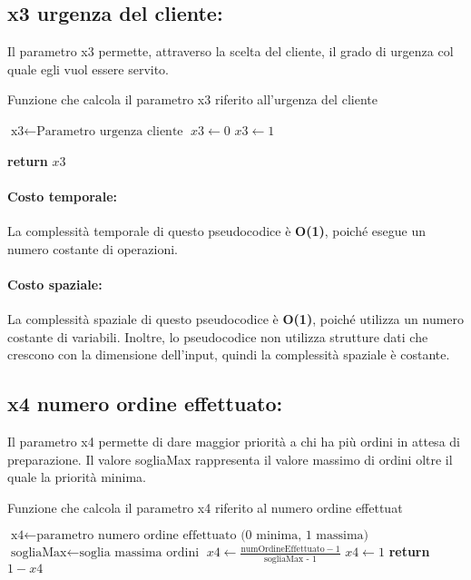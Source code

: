 \subsection{x3 urgenza del cliente:}
Il  parametro x3 permette, attraverso la scelta del cliente, il grado di urgenza col quale egli vuol essere servito.
\begin{algorithm}[h]
	\begin{algorithmic}[h!]
		\caption{Funzione che calcola il parametro x3 riferito all'urgenza del cliente}
		\medskip
		\State $\text{x3} \gets \text{Parametro urgenza cliente}$
		\medskip
		\State $x3 \gets 0$  
		\State $x3 \gets 1$  
		\EndIf
		
		\State \textbf{return} $x3$
		\EndFunction
	\end{algorithmic}
\end{algorithm}

\paragraph{Costo temporale:}
La complessità temporale di questo pseudocodice è \textbf{O(1)}, poiché esegue un numero costante di operazioni.

\paragraph{Costo spaziale:}
La complessità spaziale di questo pseudocodice è \textbf{O(1)}, poiché utilizza un numero costante di variabili. Inoltre, lo pseudocodice non utilizza strutture dati che crescono con la dimensione dell'input, quindi la complessità spaziale è costante.

\subsection{x4 numero ordine effettuato:}
Il  parametro x4 permette di dare maggior priorità a chi ha più ordini in attesa di preparazione. Il valore sogliaMax rappresenta il valore massimo di ordini oltre il quale la priorità minima.
\begin{algorithm}[h]
	\begin{algorithmic}[h!]
		\caption{Funzione che calcola il parametro x4 riferito al numero ordine effettuat}
		\medskip
		\State $\text{x4} \gets \text{parametro numero ordine effettuato (0 minima, 1 massima)}$
		\State $\text{sogliaMax} \gets \text{soglia massima ordini}$
		\medskip
		\State $x4 \gets \frac{\text{numOrdineEffettuato} - 1}{\text{sogliaMax - 1}}$ 
		\Else
		\State $x4 \gets 1$ 
		\EndIf
		\State \textbf{return} $1 - x4$
		\EndFunction
	\end{algorithmic}
\end{algorithm}

